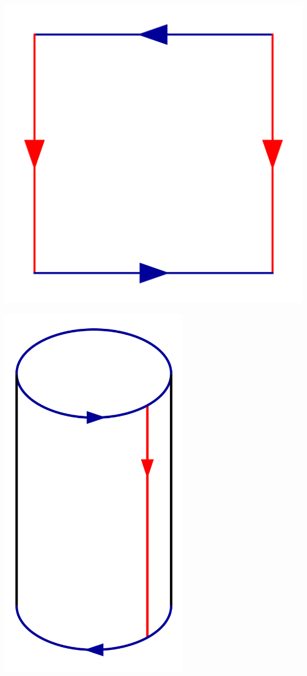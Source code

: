 \begin{example}
\begin{enumerate}[1)]
\begin{minipage}{\textwidth}
\begin{minipage}{0.3\textwidth}
                        \includegraphics[width=\textwidth]{figures/1024px-Klein_Bottle_Folding_1.svg.png}
                \end{minipage}
                \begin{minipage}{0.3\textwidth}
                    \centering
                    \includegraphics[width=0.6\textwidth]{figures/800px-Klein_Bottle_Folding_2.svg.png}

\end{minipage}
\end{minipage}
\end{enumerate}
\end{example}
